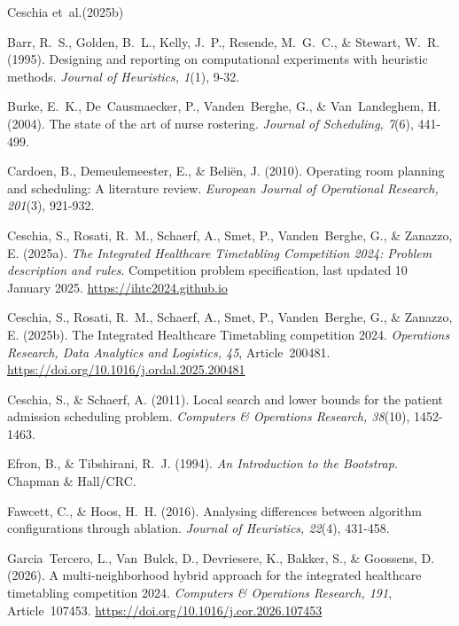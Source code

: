 \documentclass[11pt]{article}
\begin{document}
	\newpage
	\begin{thebibliography}{Ceschia et~al.(2025b)}
		
		Barr, R.~S., Golden, B.~L., Kelly, J.~P., Resende, M.~G.~C., \& Stewart, W.~R. (1995).
		Designing and reporting on computational experiments with heuristic methods.
		\emph{Journal of Heuristics, 1}(1), 9-32.

		Burke, E.~K., De~Causmaecker, P., Vanden~Berghe, G., \& Van~Landeghem, H. (2004).
		The state of the art of nurse rostering. \emph{Journal of Scheduling, 7}(6), 441-499.
		
		Cardoen, B., Demeulemeester, E., \& Beli\"en, J. (2010).
		Operating room planning and scheduling: A literature review.
		\emph{European Journal of Operational Research, 201}(3), 921-932.
		
		Ceschia, S., Rosati, R.~M., Schaerf, A., Smet, P., Vanden~Berghe, G., \& Zanazzo, E. (2025a).
		\emph{The Integrated Healthcare Timetabling Competition 2024: Problem description and rules}.
		Competition problem specification, last updated 10 January 2025. \url{https://ihtc2024.github.io}
		
		Ceschia, S., Rosati, R.~M., Schaerf, A., Smet, P., Vanden~Berghe, G., \& Zanazzo, E. (2025b).
		The Integrated Healthcare Timetabling competition 2024.
		\emph{Operations Research, Data Analytics and Logistics, 45}, Article~200481.
		\url{https://doi.org/10.1016/j.ordal.2025.200481}
		
		Ceschia, S., \& Schaerf, A. (2011).
		Local search and lower bounds for the patient admission scheduling problem.
		\emph{Computers \& Operations Research, 38}(10), 1452-1463.

		Efron, B., \& Tibshirani, R.~J. (1994).
		\emph{An Introduction to the Bootstrap}. Chapman \& Hall/CRC.

		Fawcett, C., \& Hoos, H.~H. (2016).
		Analysing differences between algorithm configurations through ablation.
		\emph{Journal of Heuristics, 22}(4), 431-458.
		
		Garcia~Tercero, L., Van~Bulck, D., Devriesere, K., Bakker, S., \& Goossens, D. (2026).
		A multi-neighborhood hybrid approach for the integrated healthcare timetabling competition 2024.
		\emph{Computers \& Operations Research, 191}, Article~107453.
		\url{https://doi.org/10.1016/j.cor.2026.107453}
		

\end{thebibliography}
\end{document}
